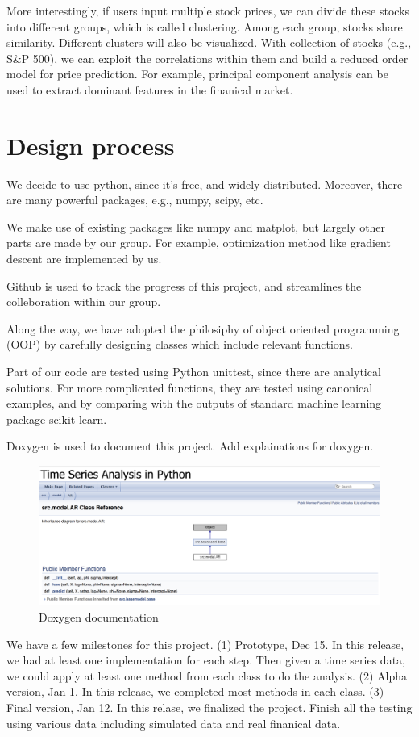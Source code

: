 \documentclass[12pt,a4paper]{article}
\begin{document}
More interestingly, if users input multiple stock prices, we can divide these stocks into different groups, which is called clustering. Among each group, stocks share similarity. Different clusters will also be visualized. With collection of stocks (e.g., S\&P 500), we can exploit the correlations within them and build a reduced order model for price prediction. For example, principal component analysis can be used to extract dominant features in the finanical market.

\section{Design process}
We decide to use python, since it's free, and widely distributed. Moreover, there are many powerful packages, e.g., numpy, scipy, etc.

We make use of existing packages like numpy and matplot, but largely other parts are made by our group. For example, optimization method like gradient descent are implemented by us.

Github is used to track the progress of this project, and streamlines the colleboration within our group.

Along the way, we have adopted the philosiphy of object oriented programming (OOP) by carefully designing classes which include relevant functions.

Part of our code are tested using Python unittest, since there are analytical solutions. For more complicated functions, they are tested using canonical examples, and by comparing with the outputs of standard machine learning package scikit-learn.

Doxygen is used to document this project. Add explainations for doxygen.
\begin{figure}[H]
        \centering
     \includegraphics[width=.7\linewidth]{./Figure/Doxygen.png}
\caption{Doxygen documentation}
\end{figure}

We have a few milestones for this project. (1) Prototype, Dec 15. In this release, we had at least one implementation for each step. Then given a time series data, we could apply at least one method from each class to do the analysis. (2) Alpha version, Jan 1. In this release, we completed most methods in each class. (3) Final version, Jan 12.  In this relase, we finalized the project. Finish all the testing using various data including simulated data and real finanical data.
\end{document}
